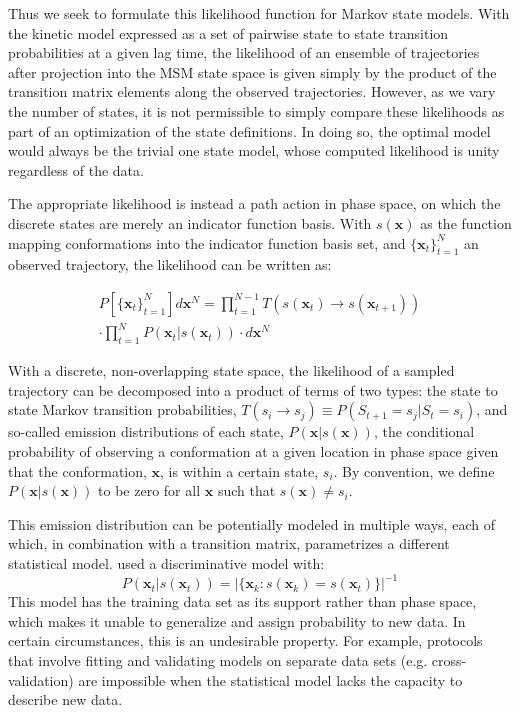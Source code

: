 \documentclass[journal=jpcbfk, layout=traditional, manuscript=article]{achemso}
\begin{document}
Thus we seek to formulate this likelihood function for Markov state models. With the kinetic model expressed as a set of pairwise state to state transition probabilities at a given lag time, the likelihood of an ensemble of trajectories after projection into the MSM state space is given simply by the product of the transition matrix elements along the observed trajectories. However, as we vary the number of states, it is not permissible to simply compare these likelihoods as part of an optimization of the state definitions. In doing so, the optimal model would always be the trivial one state model, whose computed likelihood is unity regardless of the data.

The appropriate likelihood is instead a path action in phase space, on which the discrete states are merely an indicator function basis. With $s(\mathbf{x})$ as the function mapping conformations into the indicator function basis set, and $\{\mathbf{x}_t\}_{t=1}^N$ an observed trajectory, the likelihood can be written as:

\begin{equation}
\begin{split}
P\left[\{\mathbf{x}_t\}_{t=1}^N\right] d\mathbf{x}^N = \prod_{t=1}^{N-1} T(s(\mathbf{x}_t) \rightarrow s(\mathbf{x}_{t+1})) \\
\cdot \prod_{t=1}^{N} P(\mathbf{x}_t | s(\mathbf{x}_t)) \cdot d\mathbf{x}^N
\label{eq:like}
\end{split}
\end{equation}

With a discrete, non-overlapping state space, the likelihood of a sampled trajectory can be decomposed into a product of terms of two types: the state to state Markov transition probabilities, $T(s_i \rightarrow s_j) \equiv P(S_{t+1}=s_j | S_{t}=s_i)$, and so-called emission distributions of each state, $P(\mathbf{x} | s(\mathbf{x}))$, the conditional probability of observing a conformation at a given location in phase space given that the conformation, $\mathbf{x}$, is within a certain state, $s_i$. By convention, we define $P(\mathbf{x}| s(\mathbf{x}))$ to be zero for all $\mathbf{x}$ such that $s(\mathbf{x}) \neq s_i$. 

This emission distribution can be potentially modeled in multiple ways, each of which, in combination with a transition matrix, parametrizes a different statistical model. \citet{Kellogg2012Evaluation} used a discriminative model with:
\begin{equation}
P(\mathbf{x}_t | s(\mathbf{x}_t)) = \big| \{ \mathbf{x}_k : s(\mathbf{x}_k) = s(\mathbf{x}_t) \} \big|^{-1}
\end{equation} This model has the training data set as its support rather than phase space, which makes it unable to generalize and assign probability to new data. In certain circumstances, this is an undesirable property. For example, protocols that involve fitting and validating models on separate data sets (e.g. cross-validation) are impossible when the statistical model lacks the capacity to describe new data.
\end{document}
